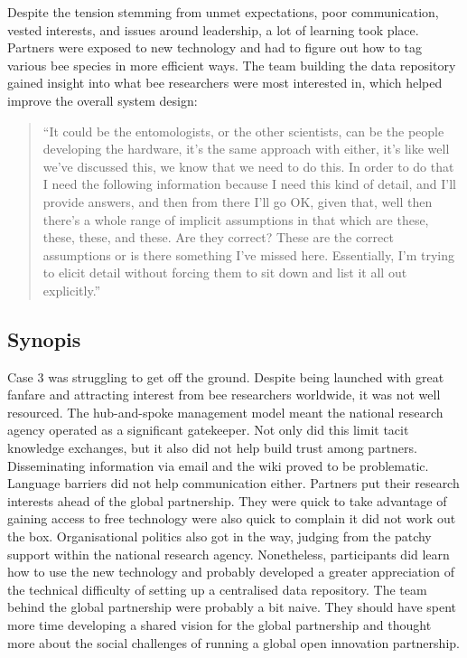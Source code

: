 Despite the tension stemming from unmet expectations, poor communication, vested interests, and issues around leadership, a lot of learning took place. Partners were exposed to new technology and had to figure out how to tag various bee species in more efficient ways. The team building the data repository gained insight into what bee researchers were most interested in, which helped improve the overall system design:

\begin{quote}
\small
\enquote{It could be the entomologists, or the other scientists, can be the people developing the hardware, it's the same approach with either, it's like well we've discussed this, we know that we need to do this. In order to do that I need the following information because I need this kind of detail, and I'll provide answers, and then from there I'll go OK, given that, well then there’s a whole range of implicit assumptions in that which are these, these, these, and these. Are they correct?  These are the correct assumptions or is there something I've missed here. Essentially, I'm trying to elicit detail without forcing them to sit down and list it all out explicitly.} \\
\end{quote}

\subsection{Synopis}

Case 3 was struggling to get off the ground. Despite being launched with great fanfare and attracting interest from bee researchers worldwide, it was not well resourced. The hub-and-spoke management model meant the national research agency operated as a significant gatekeeper. Not only did this limit tacit knowledge exchanges, but it also did not help build trust among partners. Disseminating information via email and the wiki proved to be problematic. Language barriers did not help communication either. Partners put their research interests ahead of the global partnership. They were quick to take advantage of gaining access to free technology were also quick to complain it did not work out the box. Organisational politics also got in the way, judging from the patchy support within the national research agency. Nonetheless, participants did learn how to use the new technology and probably developed a greater appreciation of the technical difficulty of setting up a centralised data repository. The team behind the global partnership were probably a bit naive. They should have spent more time developing a shared vision for the global partnership and thought more about the social challenges of running a global open innovation partnership.

